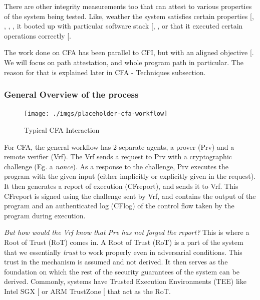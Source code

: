\documentclass[a4paper, nobind]{templates/ociamthesis}
\begin{document}
There are other integrity measurements too that can attest to various properties
of the system being tested.
Like, weather the system satisfies certain properties {[}, , , \citeproc{ref-sadeghi2004property}{46}{]},
it booted up with particular software stack {[}, \citeproc{ref-gasser1989digital}{27}{]},
or that it executed certain operations correctly {[}\citeproc{ref-sun2020oat}{52}{]}.

The work done on CFA has been parallel to CFI, but with an aligned objective {[}\citeproc{ref-sok}{5}{]}.
We will focus on path attestation, and whole program path in particular.
The reason for that is explained later in CFA - Techniques subsection.

\subsubsection{General Overview of the process}\label{general-overview-of-the-process}

\begin{figure}[H]

{\centering \texttt{[image: ./imgs/placeholder-cfa-workflow]} 

}

\caption{Typical CFA Interaction}\label{fig:cfa-workflow}
\end{figure}

For CFA, the general workflow has 2 separate agents, a prover (Prv) and a remote verifier (Vrf).
The Vrf sends a request to Prv with a cryptographic challenge (Eg. a \emph{nonce}).
As a response to the challenge, Prv executes the program with the given
input (either implicitly or explicitly given in the request).
It then generates a report of execution (CFreport), and sends it to Vrf.
This CFreport is signed using the challenge sent by Vrf, and contains the output of the program and an
authenticated log (CFlog) of the control flow taken by the program during execution.

\emph{But how would the Vrf know that Prv has not forged the report?}
This is where a Root of Trust (RoT) comes in.
A Root of Trust (RoT) is a part of the system that we essentially \emph{trust} to work
properly even in adversarial conditions. This trust in the mechanism is assumed and not derived.
It then serves as the foundation on which the rest of the security guarantees
of the system can be derived. Commonly, systems have Trusted Execution Environments
(TEE) like Intel SGX {[}\citeproc{ref-intel-sgx}{33}{]} or ARM TrustZone {[}\citeproc{ref-armtz}{7}{]} that act as the RoT.
\end{document}
